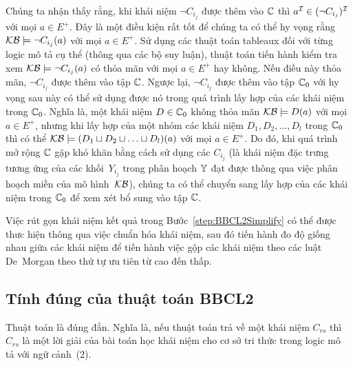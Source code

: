 Chúng ta nhận thấy rằng, khi khái niệm $\neg C_{i_j}$ được thêm vào $\mathbb{C}$ thì $a^{\mathcal{I}} \in (\neg C_{i_j})^{\mathcal{I}}$ với mọi $a \in E^+$. Đây là một điều kiện rất tốt để chúng ta có thể hy vọng rằng $\mathcal{KB} \models \neg C_{i_j}(a)$ với mọi $a \in E^+$. Sử dụng các thuật toán tableaux đối với từng logic mô tả cụ thể (thông qua các bộ suy luận), thuật toán \BBCLearn tiến hành kiểm tra xem $\mathcal{KB} \models \neg C_{i_j}(a)$ có thỏa mãn với mọi $a \in E^+$ hay không. Nếu điều này thỏa mãn, $\neg C_{i_j}$ được thêm vào tập $\mathbb{C}$. Ngược lại, $\neg C_{i_j}$ được thêm vào tập $\mathbb{C}_0$ với hy vọng sau này có thể sử dụng được nó trong quá trình lấy hợp của các khái niệm trong $\mathbb{C}_0$. Nghĩa là, một khái niệm $D \in \mathbb{C}_0$ không thỏa mãn $\mathcal{KB} \models D(a)$ với mọi $a \in E^+$, nhưng khi lấy hợp của một nhóm các khái niệm $D_1, D_2, \ldots, D_l$ trong $\mathbb{C}_0$ thì có thể $\mathcal{KB} \models (D_1 \sqcup D_2 \sqcup \ldots \sqcup D_l)(a)$ với mọi $a \in E^+$.
Do đó, khi quá trình mở rộng $\mathbb{C}$ gặp khó khăn bằng cách sử dụng các $C_{i_j}$ (là khái niệm đặc trưng tương ứng của các khối~$Y_{i_j}$ trong phân hoạch $\mathbb{Y}$ đạt được thông qua việc phân hoạch miền của mô hình~$\mathcal{KB}$), chúng ta có thể chuyển sang lấy hợp của các khái niệm trong $\mathbb{C}_0$ để xem xét bổ sung vào tập $\mathbb{C}$.

Việc rút gọn khái niệm kết quả trong Bước~\ref{step:BBCL2Simplify} có thể được thưc hiện thông qua việc chuẩn hóa khái niệm, sau đó tiến hành đo độ giống nhau giữa các khái niệm để tiến hành việc gộp các khái niệm theo các luật De~Morgan theo thứ tự ưu tiên từ cao đến thấp.

\subsection{Tính đúng của thuật toán BBCL2}

\begin{Proposition}
	Thuật toán \BBCLearnS là đúng đắn. Nghĩa là, nếu thuật toán \BBCLearnS trả về một khái niệm $C_{rs}$ thì $C_{rs}$ là một lời giải của bài toán học khái niệm cho cơ sở tri thức trong logic mô tả với ngữ cảnh~(2).\myend
\end{Proposition}

